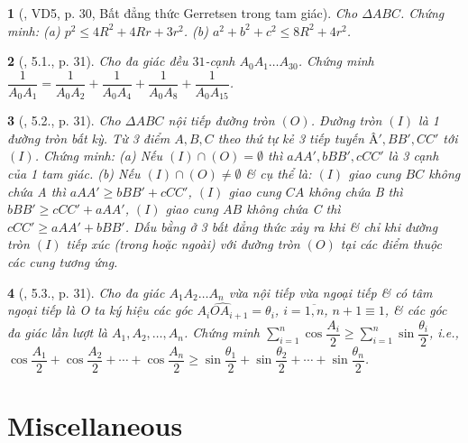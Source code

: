 \documentclass{article}
\newtheorem{baitoan}{}
\begin{document}
\begin{baitoan}[\cite{Hung_nang_cao_phat_trien_Toan_11_tap_1}, VD5, p. 30, Bất đẳng thức Gerretsen trong tam giác]
	Cho $\Delta ABC$. Chứng minh: (a) $p^2\le4R^2 + 4Rr + 3r^2$. (b) $a^2 + b^2 + c^2\le8R^2 + 4r^2$.
\end{baitoan}

\begin{baitoan}[\cite{Hung_nang_cao_phat_trien_Toan_11_tap_1}, 5.1., p. 31]
	Cho đa giác đều $31$-cạnh $A_0A_1\ldots A_{30}$. Chứng minh $\dfrac{1}{A_0A_1} = \dfrac{1}{A_0A_2} + \dfrac{1}{A_0A_4} + \dfrac{1}{A_0A_8} + \dfrac{1}{A_0A_{15}}$.
\end{baitoan}

\begin{baitoan}[\cite{Hung_nang_cao_phat_trien_Toan_11_tap_1}, 5.2., p. 31]
	Cho $\Delta ABC$ nội tiếp đường tròn $(O)$. Đường tròn $(I)$ là 1 đường tròn bất kỳ. Từ 3 điểm $A,B,C$ theo thứ tự kẻ 3 tiếp tuyến $Â',BB',CC'$ tới $(I)$. Chứng minh: (a) Nếu $(I)\cap(O) = \emptyset$ thì $aAA',bBB',cCC'$ là 3 cạnh của 1 tam giác. (b) Nếu $(I)\cap(O)\ne\emptyset$ \& cụ thể là: $(I)$ giao cung $BC$ không chứa A thì $aAA'\ge bBB' + cCC'$, $(I)$ giao cung $CA$ không chứa B thì $bBB'\ge cCC' + aAA'$, $(I)$ giao cung $AB$ không chứa C thì $cCC'\ge aAA' + bBB'$. Dấu bằng ở 3 bất đẳng thức xảy ra khi \& chỉ khi đường tròn $(I)$ tiếp xúc (trong hoặc ngoài) với đường tròn $(O)$ tại các điểm thuộc các cung tương ứng.
\end{baitoan}

\begin{baitoan}[\cite{Hung_nang_cao_phat_trien_Toan_11_tap_1}, 5.3., p. 31]
	Cho đa giác $A_1A_2\ldots A_n$ vừa nội tiếp vừa ngoại tiếp \& có tâm ngoại tiếp là O ta ký hiệu các góc $\widehat{A_iOA_{i+1}} = \theta_i$, $i = \overline{1,n}$, $n + 1\equiv1$, \& các góc đa giác lần lượt là $A_1,A_2,\ldots,A_n$. Chứng minh $\sum_{i=1}^n \cos\dfrac{A_i}{2}\ge\sum_{i=1}^n \sin\dfrac{\theta_i}{2}$, i.e., $\cos\dfrac{A_1}{2} + \cos\dfrac{A_2}{2} + \cdots + \cos\dfrac{A_n}{2}\ge\sin\dfrac{\theta_1}{2} + \sin\dfrac{\theta_2}{2} + \cdots + \sin\dfrac{\theta_n}{2}$.
\end{baitoan}


\section{Miscellaneous}
\end{document}
